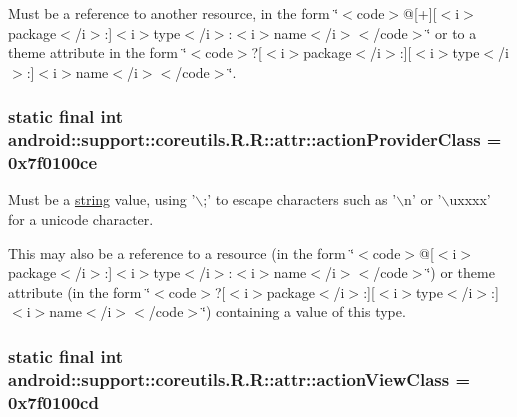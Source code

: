 Must be a reference to another resource, in the form \char`\"{}$<$code$>$@\mbox{[}+\mbox{]}\mbox{[}$<$i$>$package$<$/i$>$:\mbox{]}$<$i$>$type$<$/i$>$:$<$i$>$name$<$/i$>$$<$/code$>$\char`\"{} or to a theme attribute in the form \char`\"{}$<$code$>$?\mbox{[}$<$i$>$package$<$/i$>$:\mbox{]}\mbox{[}$<$i$>$type$<$/i$>$:\mbox{]}$<$i$>$name$<$/i$>$$<$/code$>$\char`\"{}. \hypertarget{classandroid_1_1support_1_1coreutils_1_1_r_1_1attr_2bfa032ca9e9a7f43040d26d6db7f06e}{
\subsubsection[{actionProviderClass}]{\setlength{\rightskip}{0pt plus 5cm}static final int android::support::coreutils.R.R::attr::actionProviderClass = 0x7f0100ce}}
\label{classandroid_1_1support_1_1coreutils_1_1_r_1_1attr_2bfa032ca9e9a7f43040d26d6db7f06e}


Must be a \hyperlink{classandroid_1_1support_1_1coreutils_1_1_r_1_1string}{string} value, using '$\backslash$;' to escape characters such as '$\backslash$n' or '$\backslash$uxxxx' for a unicode character. 

This may also be a reference to a resource (in the form \char`\"{}$<$code$>$@\mbox{[}$<$i$>$package$<$/i$>$:\mbox{]}$<$i$>$type$<$/i$>$:$<$i$>$name$<$/i$>$$<$/code$>$\char`\"{}) or theme attribute (in the form \char`\"{}$<$code$>$?\mbox{[}$<$i$>$package$<$/i$>$:\mbox{]}\mbox{[}$<$i$>$type$<$/i$>$:\mbox{]}$<$i$>$name$<$/i$>$$<$/code$>$\char`\"{}) containing a value of this type. \hypertarget{classandroid_1_1support_1_1coreutils_1_1_r_1_1attr_61e50c4349e4fa0a53fb8bf79e0ba272}{
\subsubsection[{actionViewClass}]{\setlength{\rightskip}{0pt plus 5cm}static final int android::support::coreutils.R.R::attr::actionViewClass = 0x7f0100cd}}
\label{classandroid_1_1support_1_1coreutils_1_1_r_1_1attr_61e50c4349e4fa0a53fb8bf79e0ba272}


